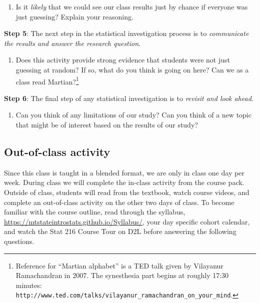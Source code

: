 \documentclass[
]{report}
\providecommand{\tightlist}{%
  \setlength{\itemsep}{0pt}\setlength{\parskip}{0pt}}
\begin{document}
\vspace{.5in}

\begin{enumerate}
\def\labelenumi{\arabic{enumi}.}
\setcounter{enumi}{16}
\tightlist
\item
  Is it \emph{likely} that we could see our class results just by chance if everyone was just guessing? Explain your reasoning.
\end{enumerate}

\vspace{.5in}

\textbf{Step 5}: The next step in the statistical investigation process is to \emph{communicate the results and answer the research question}.

\begin{enumerate}
\def\labelenumi{\arabic{enumi}.}
\setcounter{enumi}{17}
\tightlist
\item
  Does this activity provide strong evidence that students were not just guessing at random? If so, what do you think is going on here? Can we as a class read Martian?\footnote{Reference for ``Martian alphabet'' is a TED talk given by Vilayanur Ramachandran in 2007. The synesthesia part begins at roughly 17:30 minutes: \texttt{http://www.ted.com/talks/vilayanur\_ramachandran\_on\_your\_mind}.}
\end{enumerate}

\vspace{1in}

\textbf{Step 6}: The final step of any statistical investigation is to \emph{revisit and look ahead}.

\begin{enumerate}
\def\labelenumi{\arabic{enumi}.}
\setcounter{enumi}{18}
\tightlist
\item
  Can you think of any limitations of our study? Can you think of a new topic that might be of interest based on the results of our study?
\end{enumerate}

\vspace{1in}

\newpage

\hypertarget{out-of-class-activity}{%
\subsection{Out-of-class activity}\label{out-of-class-activity}}

Since this class is taught in a blended format, we are only in class one day per week. During class we will complete the in-class activity from the course pack. Outside of class, students will read from the textbook, watch course videos, and complete an out-of-class activity on the other two days of class. To become familiar with the course outline, read through the syllabus, \url{https://mtstateintrostats.github.io/Syllabus/}, your day specific cohort calendar, and watch the Stat 216 Course Tour on D2L before answering the following questions.
\end{document}
